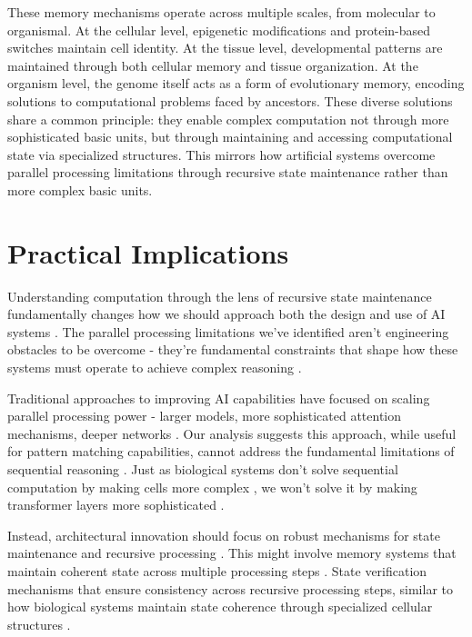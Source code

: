 \documentclass[12pt]{article}
\begin{document}
These memory mechanisms operate across multiple scales, from molecular to organismal. At the cellular level, epigenetic modifications and protein-based switches maintain cell identity. At the tissue level, developmental patterns are maintained through both cellular memory and tissue organization. At the organism level, the genome itself acts as a form of evolutionary memory, encoding solutions to computational problems faced by ancestors. These diverse solutions share a common principle: they enable complex computation not through more sophisticated basic units, but through maintaining and accessing computational state via specialized structures. This mirrors how artificial systems overcome parallel processing limitations through recursive state maintenance rather than more complex basic units.

\section{Practical Implications}

Understanding computation through the lens of recursive state maintenance fundamentally changes how we should approach both the design and use of AI systems \cite{dickson2024trust,ahn2024recursive}. The parallel processing limitations we've identified aren't engineering obstacles to be overcome - they're fundamental constraints that shape how these systems must operate to achieve complex reasoning \cite{merrill2023parallelism}.

Traditional approaches to improving AI capabilities have focused on scaling parallel processing power - larger models, more sophisticated attention mechanisms, deeper networks \cite{shallue2019measuring}. Our analysis suggests this approach, while useful for pattern matching capabilities, cannot address the fundamental limitations of sequential reasoning \cite{peng2024limitations}. Just as biological systems don't solve sequential computation by making cells more complex \cite{wang2023parallel}, we won't solve it by making transformer layers more sophisticated \cite{zhao2024epha}.

Instead, architectural innovation should focus on robust mechanisms for state maintenance and recursive processing \cite{jung2020new}. This might involve memory systems that maintain coherent state across multiple processing steps \cite{zhu2024overcoming}. State verification mechanisms that ensure consistency across recursive processing steps, similar to how biological systems maintain state coherence through specialized cellular structures \cite{espinosa2024molecular}.
\end{document}
